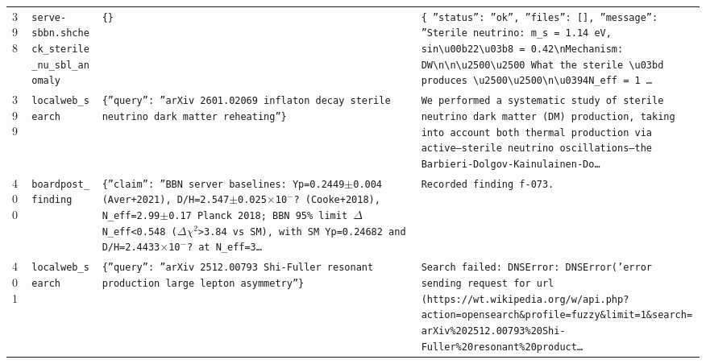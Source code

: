 \documentclass[11pt,a4paper]{article}
\begin{document}
\begin{longtable}{@{}p{}p{}p{}p{}@{}}
398 & \texttt{serve-sbbn.sh}\newline\texttt{check\_\allowbreak{}sterile\_\allowbreak{}nu\_\allowbreak{}sbl\_\allowbreak{}anomaly} & \texttt{\{\}\allowbreak{}} & \texttt{\{   ''status'':\allowbreak{} ''ok'',\allowbreak{}   ''files'':\allowbreak{} []\allowbreak{},\allowbreak{}   ''message'':\allowbreak{} ''Sterile neutrino:\allowbreak{} m\_\allowbreak{}s =\allowbreak{} 1.14 eV,\allowbreak{} sin\textbackslash{}\allowbreak{}u00b22\textbackslash{}\allowbreak{}u03b8 =\allowbreak{} 0.42\textbackslash{}\allowbreak{}nMechanism:\allowbreak{} DW\textbackslash{}\allowbreak{}n\textbackslash{}\allowbreak{}n\textbackslash{}\allowbreak{}u2500\textbackslash{}\allowbreak{}u2500 What the sterile \textbackslash{}\allowbreak{}u03bd produces \textbackslash{}\allowbreak{}u2500\textbackslash{}\allowbreak{}u2500\textbackslash{}\allowbreak{}n\textbackslash{}\allowbreak{}u0394N\_\allowbreak{}eff =\allowbreak{} 1 \ldots{}\allowbreak{}} \\
399 & \texttt{local}\newline\texttt{web\_\allowbreak{}search} & \texttt{\{''query'':\allowbreak{} ''arXiv 2601.02069 inflaton decay sterile neutrino dark matter reheating''\}\allowbreak{}} & \texttt{We performed a systematic study of sterile neutrino dark matter (DM)\allowbreak{} production,\allowbreak{} taking into account both thermal production via active--sterile neutrino oscillations---the Barbieri-Dolgov-Kainulainen-Do\ldots{}\allowbreak{}} \\
400 & \texttt{board}\newline\texttt{post\_\allowbreak{}finding} & \texttt{\{''claim'':\allowbreak{} ''BBN server baselines:\allowbreak{} Yp=\allowbreak{}0.2449$\pm$0.004 (Aver+2021)\allowbreak{},\allowbreak{} D/\allowbreak{}H=\allowbreak{}2.547$\pm$0.025$\times$10$^-$? (Cooke+2018)\allowbreak{},\allowbreak{} N\_\allowbreak{}eff=\allowbreak{}2.99$\pm$0.17 Planck 2018;\allowbreak{} BBN 95\% limit $\Delta$N\_\allowbreak{}eff\textless{}\allowbreak{}0.548 ($\Delta$$\chi$$^2$\textgreater{}\allowbreak{}3.84 vs SM)\allowbreak{},\allowbreak{} with SM Yp=\allowbreak{}0.24682 and D/\allowbreak{}H=\allowbreak{}2.4433$\times$10$^-$? at N\_\allowbreak{}eff=\allowbreak{}3\ldots{}\allowbreak{}} & \texttt{Recorded finding f-073.} \\
401 & \texttt{local}\newline\texttt{web\_\allowbreak{}search} & \texttt{\{''query'':\allowbreak{} ''arXiv 2512.00793 Shi-Fuller resonant production large lepton asymmetry''\}\allowbreak{}} & \texttt{Search failed:\allowbreak{} DNSError:\allowbreak{} DNSError('error sending request for url (https:\allowbreak{}/\allowbreak{}/\allowbreak{}wt.wikipedia.org/\allowbreak{}w/\allowbreak{}api.php?action=\allowbreak{}opensearch\&profile=\allowbreak{}fuzzy\&limit=\allowbreak{}1\&search=\allowbreak{}arXiv\%202512.00793\%20Shi-Fuller\%20resonant\%20product\ldots{}\allowbreak{}} \\

\end{longtable}
\end{document}
